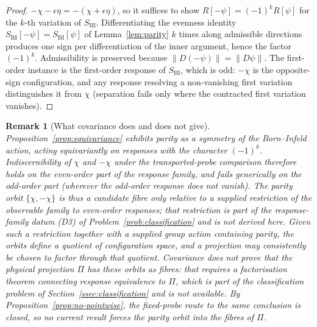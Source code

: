 \documentclass[11pt,a4paper]{article}
\newtheorem{remark}[theorem]{Remark}
\newcommand{\Proj}{\Pi}
\newcommand{\chifield}{\chi}
\begin{document}
    \begin{proof}
      $-\chifield - \epsilon\eta = -(\chifield + \epsilon\eta)$, so it suffices to show
      $R[-\psi] = (-1)^{k} R[\psi]$ for the $k$-th variation of $S_{\mathrm{BI}}$.
      Differentiating the evenness identity $S_{\mathrm{BI}}[-\psi] = S_{\mathrm{BI}}[\psi]$
      of Lemma~\ref{lem:parity} $k$ times along admissible directions produces one sign per
      differentiation of the inner argument, hence the factor $(-1)^{k}$.
      Admissibility is preserved because $\|D(-\psi)\| = \|D\psi\|$.
      The first-order instance is the first-order response of $S_{\mathrm{BI}}$, which is odd:
      $-\chifield$ is the opposite-sign configuration, and any response resolving a
      non-vanishing first variation distinguishes it from $\chifield$ (separation fails
      only where the contracted first variation vanishes).
    \end{proof}

    \begin{remark}[What covariance does and does not give]
      \label{rem:equivariance-scope}
      Proposition~\ref{prop:equivariance} exhibits parity as a symmetry of the Born--Infeld
      \emph{action}, acting equivariantly on responses with the character $(-1)^{k}$.
      Indiscernibility of $\chifield$ and $-\chifield$ under the transported-probe
      comparison therefore holds on the even-order part of the response family, and fails
      generically on the odd-order part (wherever the odd-order response does not vanish).
      The parity orbit $\{\chifield,-\chifield\}$ is thus a candidate fibre only relative
      to a \emph{supplied} restriction of the observable family to even-order responses;
      that restriction is part of the response-family datum (D3) of
      Problem~\ref{prob:classification} and is not derived here.
      Given such a restriction together with a supplied group action containing parity, the
      orbits define a quotient of configuration space, and a projection may consistently be
      \emph{chosen} to factor through that quotient.
      Covariance does not prove that the physical projection $\Proj$ has these orbits as
      fibres: that requires a factorisation theorem connecting response equivalence to
      $\Proj$, which is part of the classification problem of
      Section~\ref{ssec:classification} and is not available.
      By Proposition~\ref{prop:no-pointwise}, the fixed-probe route to the same conclusion
      is closed, so no current result forces the parity orbit into the fibres of $\Proj$.
    \end{remark}
\end{document}
